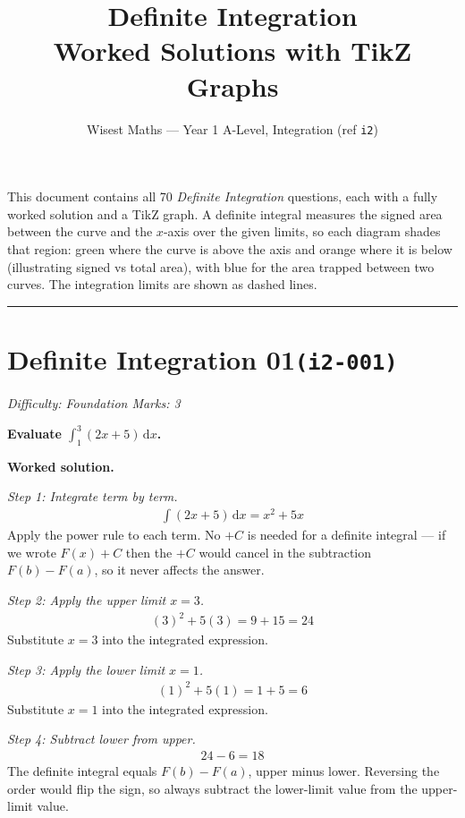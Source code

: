 \documentclass[11pt]{article}
\title{\textbf{Definite Integration}\\[0.3em]\large Worked Solutions with TikZ Graphs}
\author{Wisest Maths --- Year 1 A-Level, Integration (ref \texttt{i2})}
\date{}
\newcommand{\question}[1]{\par\medskip\noindent\textbf{#1}\par}
\begin{document}
\maketitle
\noindent This document contains all 70 \emph{Definite Integration} questions, each with a
fully worked solution and a TikZ graph. A definite integral measures the signed area between the curve and the
\(x\)-axis over the given limits, so each diagram shades that region: \textcolor{green!55!black}{green} where the
curve is above the axis and \textcolor{orange!80!black}{orange} where it is below (illustrating signed vs total
area), with \textcolor{blue!60!black}{blue} for the area trapped between two curves. The integration limits are
shown as dashed lines.
\tableofcontents
\bigskip
\hrule

\section*{Definite Integration 01\quad\small\texttt{(i2-001)}}
\textit{Difficulty: Foundation \quad\textbar\quad Marks: 3}

\question{Evaluate \( \displaystyle\int_1^3 (2x + 5)\, \mathrm{d}x \).}

\textbf{Worked solution.}

\textit{Step 1: Integrate term by term.}
\[\begin{gathered}
\int (2x + 5)\, \mathrm{d}x = x^2 + 5x
\end{gathered}\]
Apply the power rule to each term. No \( +C \) is needed for a definite integral --- if we wrote \( F(x) + C \) then the \( +C \) would cancel in the subtraction \( F(b) - F(a) \), so it never affects the answer.

\textit{Step 2: Apply the upper limit \( x = 3 \).}
\[\begin{gathered}
(3)^2 + 5(3) = 9 + 15 = 24
\end{gathered}\]
Substitute \( x = 3 \) into the integrated expression.

\textit{Step 3: Apply the lower limit \( x = 1 \).}
\[\begin{gathered}
(1)^2 + 5(1) = 1 + 5 = 6
\end{gathered}\]
Substitute \( x = 1 \) into the integrated expression.

\textit{Step 4: Subtract lower from upper.}
\[\begin{gathered}
24 - 6 = 18
\end{gathered}\]
The definite integral equals \( F(b) - F(a) \), upper minus lower. Reversing the order would flip the sign, so always subtract the lower-limit value from the upper-limit value.
\end{document}
